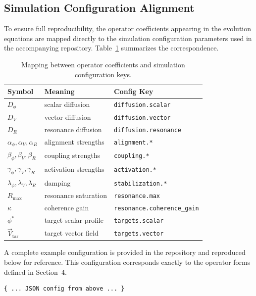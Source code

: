 \subsection{Simulation Configuration Alignment}

To ensure full reproducibility, the operator coefficients appearing in the
evolution equations are mapped directly to the simulation configuration
parameters used in the accompanying repository. Table~\ref{tab:config-map}
summarizes the correspondence.

\begin{table}[h]
\centering
\begin{tabular}{lll}
\hline
Symbol & Meaning & Config Key \\
\hline
$D_\phi$ & scalar diffusion & \texttt{diffusion.scalar} \\
$D_V$ & vector diffusion & \texttt{diffusion.vector} \\
$D_R$ & resonance diffusion & \texttt{diffusion.resonance} \\
$\alpha_\phi, \alpha_V, \alpha_R$ & alignment strengths &
\texttt{alignment.*} \\
$\beta_\phi, \beta_V, \beta_R$ & coupling strengths &
\texttt{coupling.*} \\
$\gamma_\phi, \gamma_V, \gamma_R$ & activation strengths &
\texttt{activation.*} \\
$\lambda_\phi, \lambda_V, \lambda_R$ & damping &
\texttt{stabilization.*} \\
$R_{\max}$ & resonance saturation & \texttt{resonance.max} \\
$\kappa$ & coherence gain & \texttt{resonance.coherence\_gain} \\
$\phi^\ast$ & target scalar profile & \texttt{targets.scalar} \\
$\vec{V}_{\mathrm{tar}}$ & target vector field & \texttt{targets.vector} \\
\hline
\end{tabular}
\caption{Mapping between operator coefficients and simulation configuration keys.}
\label{tab:config-map}
\end{table}

A complete example configuration is provided in the repository and reproduced
below for reference. This configuration corresponds exactly to the operator
forms defined in Section~4.

\begin{verbatim}
{ ... JSON config from above ... }
\end{verbatim}
